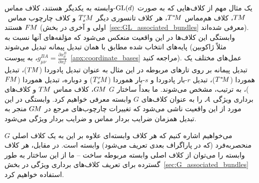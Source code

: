 یک مثال مهم از کلاف‌هایی که به صورت $\operatorname{GL}(d)$-وابسته به یکدیگر هستند، کلاف مماس $T\mkern-1.5muM$، کلاف هم‌مماس $T^{\mkern0.5mu *}\mkern-3.5muM$، هر کلاف تانسوری دیگر $\TrsM$ و کلاف چارچوب مماس~$F\mkern-1.5muM$ هستند (اولی و آخری در بخش~\ref{sec:GL_associated_bundles} معرفی شده‌اند).
وابستگی این کلاف‌ها در این واقعیت منعکس می‌شود که مؤلفه‌های آنها نسبت به پایه‌های انتخاب شده مطابق با همان تبدیل پیمانه تبدیل می‌شوند (مثلاً ژاکوبین $g^{BA}_{\mu\nu} = \frac{\partial x^B_\mu}{\partial x^A_\nu}$، به پیوست~\ref{apx:coordinate_bases} مراجعه کنید).
عمل‌های مختلف یک تبدیل پیمانه بر روی تارهای مربوطه در این مثال به عنوان تبدیل پادوردا ($T\mkern-1.5muM$)، تبدیل هموردا ($T^{\mkern0.5mu *}\mkern-3.5muM$)، تبدیل $r$-بار پادوردا و $s$-بار هموردا ($\TrsM$) و دوباره، تبدیل هموردا ($F\mkern-1.5muM$)، به ترتیب، مشخص می‌شوند.
ما بعداً ساختار $G$ $G\mkern-1.4muM$، کلاف مماس $T\mkern-1.5muM$ و کلاف‌های برداری ویژگی $\mathcal{A}$ را به عنوان کلاف‌های $G$ وابسته معرفی خواهیم کرد.
وابستگی در این مورد از این واقعیت ناشی می‌شود که تغییرات چارچوب‌های مرجع در $G\mkern-1.4muM$ منجر به تبدیل همزمان ضرایب بردار مماس و ضرایب بردار ویژگی می‌شود.

می‌خواهیم اشاره کنیم که هر کلاف وابسته‌ای علاوه بر این به یک کلاف اصلی $G$ منحصربه‌فرد (که در پاراگراف بعدی تعریف می‌شود) وابسته است.
در مقابل، هر کلاف وابسته را می‌توان از کلاف اصلی وابسته مربوطه ساخت -- ما از این ساختار به طور گسترده برای تعریف کلاف‌های برداری ویژگی در بخش~\ref{sec:G_associated_bundles} استفاده خواهیم کرد.

